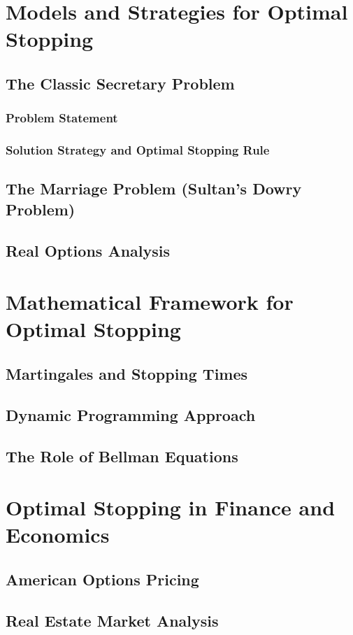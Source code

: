 \documentclass[12pt]{book} %
\begin{document}
\section{Models and Strategies for Optimal Stopping}
\subsection{The Classic Secretary Problem}
\subsubsection{Problem Statement}
\subsubsection{Solution Strategy and Optimal Stopping Rule}
\subsection{The Marriage Problem (Sultan's Dowry Problem)}
\subsection{Real Options Analysis}

\section{Mathematical Framework for Optimal Stopping}
\subsection{Martingales and Stopping Times}
\subsection{Dynamic Programming Approach}
\subsection{The Role of Bellman Equations}

\section{Optimal Stopping in Finance and Economics}
\subsection{American Options Pricing}
\subsection{Real Estate Market Analysis}
\end{document}

